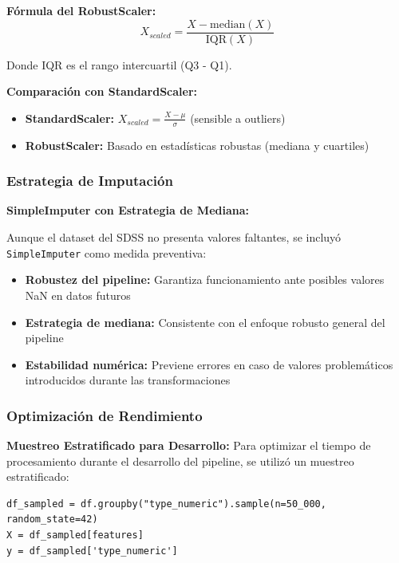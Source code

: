 \documentclass{article}
\begin{document}
\textbf{Fórmula del RobustScaler:}
\begin{equation}
X_{scaled} = \frac{X - \text{median}(X)}{\text{IQR}(X)}
\end{equation}

Donde IQR es el rango intercuartil (Q3 - Q1).

\textbf{Comparación con StandardScaler:}
\begin{itemize}
    \item \textbf{StandardScaler:} $X_{scaled} = \frac{X - \mu}{\sigma}$ (sensible a outliers)
    \item \textbf{RobustScaler:} Basado en estadísticas robustas (mediana y cuartiles)
\end{itemize}

\subsubsection{Estrategia de Imputación}

\textbf{SimpleImputer con Estrategia de Mediana:}

Aunque el dataset del SDSS no presenta valores faltantes, se incluyó \texttt{SimpleImputer} \cite{sklearn_simpleimputer} como medida preventiva:

\begin{itemize}
    \item \textbf{Robustez del pipeline:} Garantiza funcionamiento ante posibles valores NaN en datos futuros
    \item \textbf{Estrategia de mediana:} Consistente con el enfoque robusto general del pipeline
    \item \textbf{Estabilidad numérica:} Previene errores en caso de valores problemáticos introducidos durante las transformaciones
\end{itemize}

\subsubsection{Optimización de Rendimiento}

\textbf{Muestreo Estratificado para Desarrollo:}
Para optimizar el tiempo de procesamiento durante el desarrollo del pipeline, se utilizó un muestreo estratificado:

\begin{verbatim}
df_sampled = df.groupby("type_numeric").sample(n=50_000, random_state=42)
X = df_sampled[features]
y = df_sampled['type_numeric']
\end{verbatim}
\end{document}
